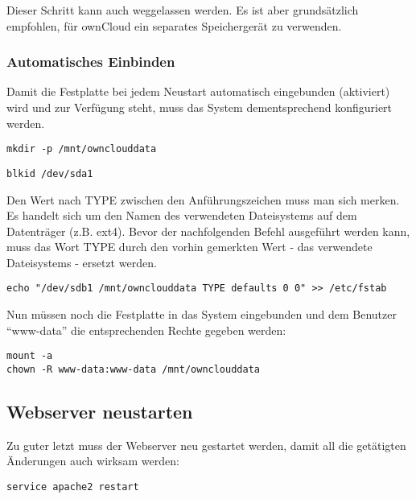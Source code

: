 Dieser Schritt kann auch weggelassen werden. Es ist aber grundsätzlich empfohlen, für ownCloud ein separates Speichergerät zu verwenden.

\subsubsection{Automatisches Einbinden}
Damit die Festplatte bei jedem Neustart automatisch eingebunden (aktiviert) wird und zur Verfügung steht, muss das System dementsprechend konfiguriert werden. 
\\

\begin{lstlisting}
mkdir -p /mnt/ownclouddata
\end{lstlisting}

\begin{lstlisting}
blkid /dev/sda1
\end{lstlisting}

Den Wert nach TYPE zwischen den Anführungszeichen muss man sich merken. Es handelt sich um den Namen des verwendeten Dateisystems auf dem Datenträger (z.B. ext4).
Bevor der nachfolgenden Befehl ausgeführt werden kann, muss das Wort TYPE durch den vorhin gemerkten Wert - das verwendete Dateisystems - ersetzt werden.
\\

\begin{lstlisting}
echo "/dev/sdb1 /mnt/ownclouddata TYPE defaults 0 0" >> /etc/fstab
\end{lstlisting}

Nun müssen noch die Festplatte in das System eingebunden und dem Benutzer ``www-data'' die entsprechenden Rechte gegeben werden:
\\

\begin{lstlisting}
mount -a
chown -R www-data:www-data /mnt/ownclouddata
\end{lstlisting}

\subsection{Webserver neustarten}
Zu guter letzt muss der Webserver neu gestartet werden, damit all die getätigten Änderungen auch wirksam werden:
\\

\begin{lstlisting}
service apache2 restart
\end{lstlisting}
